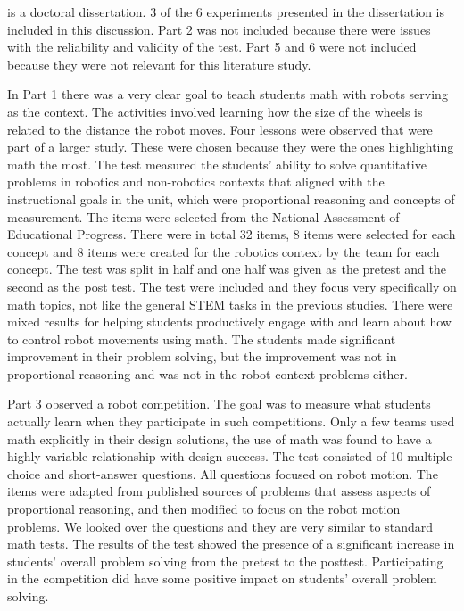 \bigskip\noindent
{} is a doctoral dissertation. 3 of the 6 experiments presented in the dissertation is included in this discussion. Part 2 was not included because there were issues with the reliability and validity of the test. Part 5 and 6 were not included because they were not relevant for this literature study.

\bigskip\noindent
In Part 1 there was a very clear goal to teach students math with robots serving as the context. The activities involved learning how the size of the wheels is related to the distance the robot moves. Four lessons were observed that were part of a larger study. These were chosen because they were the ones highlighting math the most. The test measured the students' ability to solve quantitative problems in robotics and non-robotics contexts that aligned with the instructional goals in the unit, which were proportional reasoning and concepts of measurement. The items were selected from the National Assessment of Educational Progress. There were in total 32 items, 8 items were selected for each concept and 8 items were created for the robotics context by the team for each concept. The test was split in half and one half was given as the pretest and the second as the post test. The test were included and they focus very specifically on math topics, not like the general STEM tasks in the previous studies. There were mixed results for helping students productively engage with and learn about how to control robot movements using math. The students made significant improvement in their problem solving, but the improvement was not in proportional reasoning and was not in the robot context problems either. 

\bigskip\noindent
Part 3 observed a robot competition. The goal was to measure what students actually learn when they participate in such competitions. Only a few teams used math explicitly in their design solutions, the use of math was found to have a highly variable relationship with design success. The test consisted of 10 multiple-choice and short-answer questions. All questions focused on robot motion. The items were adapted from published sources of problems that assess aspects of proportional reasoning, and then modified to focus on the robot motion problems. We looked over the questions and they are very similar to standard math tests. The results of the test showed the presence of a significant increase in students' overall problem solving from the pretest to the posttest. Participating in the competition did have some positive impact on students' overall problem solving.


